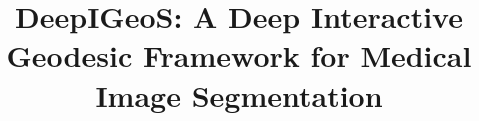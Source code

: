 \documentclass[10pt,journal,compsoc]{IEEEtran}
\begin{document}
%
\title{DeepIGeoS: A Deep Interactive Geodesic Framework for Medical Image Segmentation}
%
%
%
%
\begin{comment}
\author{Michael~Shell,~\IEEEmembership{Member,~IEEE,}
	John~Doe,~\IEEEmembership{Fellow,~OSA,}
	and~Jane~Doe,~\IEEEmembership{Life~Fellow,~IEEE}%
	\IEEEcompsocitemizethanks{\IEEEcompsocthanksitem M. Shell was with the Department
		of Electrical and Computer Engineering, Georgia Institute of Technology, Atlanta,
		GA, 30332.\protect\\
		E-mail: see http://www.michaelshell.org/contact.html
		\IEEEcompsocthanksitem J. Doe and J. Doe are with Anonymous University.}%
	\thanks{Manuscript received April 19, 2005; revised August 26, 2015.}}
\end{comment}
\end{document}
